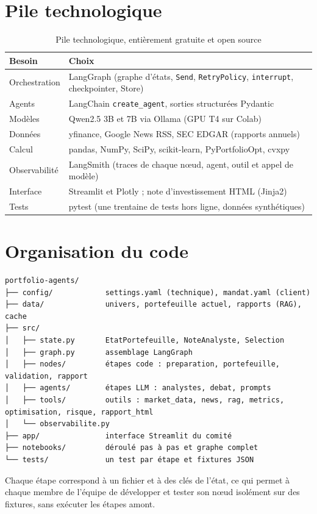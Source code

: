 \documentclass[11pt,a4paper]{report}
\begin{document}
\section{Pile technologique}
\begin{table}[H]
\centering\small
\caption{Pile technologique, entièrement gratuite et open source}
\begin{tabularx}{\textwidth}{@{}l Y@{}}
\toprule
Besoin & Choix \\
\midrule
Orchestration & LangGraph (graphe d'états, \texttt{Send}, \texttt{RetryPolicy}, \texttt{interrupt}, checkpointer, Store) \\
Agents & LangChain \texttt{create\_agent}, sorties structurées Pydantic \\
Modèles & Qwen2.5 3B et 7B via Ollama (GPU T4 sur Colab) \\
Données & yfinance, Google News RSS, SEC EDGAR (rapports annuels) \\
Calcul & pandas, NumPy, SciPy, scikit-learn, PyPortfolioOpt, cvxpy \\
Observabilité & LangSmith (traces de chaque nœud, agent, outil et appel de modèle) \\
Interface & Streamlit et Plotly ; note d'investissement HTML (Jinja2) \\
Tests & pytest (une trentaine de tests hors ligne, données synthétiques) \\
\bottomrule
\end{tabularx}
\end{table}

\section{Organisation du code}
\begin{lstlisting}
portfolio-agents/
├── config/            settings.yaml (technique), mandat.yaml (client)
├── data/              univers, portefeuille actuel, rapports (RAG), cache
├── src/
│   ├── state.py       EtatPortefeuille, NoteAnalyste, Selection
│   ├── graph.py       assemblage LangGraph
│   ├── nodes/         étapes code : preparation, portefeuille, validation, rapport
│   ├── agents/        étapes LLM : analystes, debat, prompts
│   ├── tools/         outils : market_data, news, rag, metrics, optimisation, risque, rapport_html
│   └── observabilite.py
├── app/               interface Streamlit du comité
├── notebooks/         déroulé pas à pas et graphe complet
└── tests/             un test par étape et fixtures JSON
\end{lstlisting}
Chaque étape correspond à un fichier et à des clés de l'état, ce qui permet à chaque membre de l'équipe de développer
et tester son nœud isolément sur des fixtures, sans exécuter les étapes amont.
\end{document}
